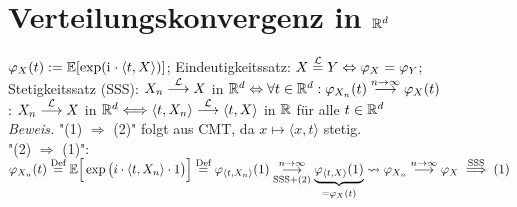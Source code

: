 \documentclass[12pt]{scrartcl}
\begin{document}
	\section{Verteilungskonvergenz in \texorpdfstring{$\mathbb{R}^d$}{Rd}}
	 $\varphi_X(t):=\mathbb{E}[\exp(\mathrm{i}\mkern1mu\cdot\langle t,X\rangle)]$; Eindeutigkeitssatz: $X\overset{\mathcal{L}}{=}Y\Leftrightarrow\varphi_X=\varphi_Y$;\\
	Stetigkeitssatz (SSS): $X_n\overset{\mathcal{L}}{\longrightarrow}X$ in $\mathbb{R}^d\Leftrightarrow\forall t\in\mathbb{R}^d:\varphi_{X_n}(t)\overset{n\to\infty}{\longrightarrow}\varphi_X(t)$\\
	: $X_n\overset{\mathcal{L}}{\longrightarrow}X$ in $\mathbb{R}^d\Longleftrightarrow\langle t,X_n\rangle\overset{\mathcal{L}}{\longrightarrow}\langle t,X\rangle$ in $\mathbb{R}$ für alle $t\in\mathbb{R}^d$\\
	\textit{Beweis.} "(1) $\Rightarrow$ (2)" folgt aus CMT, da $x\mapsto\langle x,t\rangle$ stetig.\\
	"(2) $\Rightarrow$ (1)":
	$	\varphi_{X_n}(t)
		\overset{\text{Def}}{=}\mathbb{E}\Big[\exp\big(i\cdot\langle t,X_n\rangle\cdot 1\big)\Big]
		\overset{\text{Def}}{=}\varphi_{\langle t,X_n\rangle}(1)
		\underset{\text{SSS+(2)}}{\overset{n\to\infty}{\longrightarrow}}\underbrace{\varphi_{\langle t,X\rangle}(1)}_{=\varphi_X(t)}
		\leadsto\varphi_{X_n}\stackrel{n\to\infty}{\longrightarrow}\varphi_X
		\stackrel{\text{SSS}}{\implies}(1)$
\end{document}
